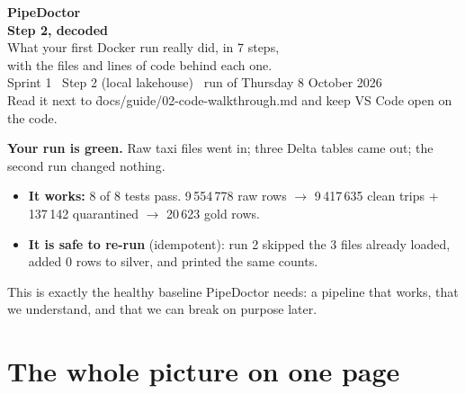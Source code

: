 \documentclass[11pt,a4paper]{article}
\let\oldsection\section
\renewcommand{\section}{\Needspace*{9\baselineskip}\oldsection}
\begin{document}
\sloppy

\begin{tcolorbox}[enhanced,colback=navy,colframe=navy,arc=4pt,boxrule=0pt,left=14pt,right=14pt,top=12pt,bottom=12pt]
{\color{white}
{\Huge\bfseries PipeDoctor\\[2pt]Step 2, decoded}\\[8pt]
{\large What your first Docker run really did, in 7 steps,\\ with the files and lines of code behind each one.}\\[10pt]
{\small Sprint 1 \textperiodcentered\ Step 2 (local lakehouse) \textperiodcentered\ run of Thursday 8 October 2026\\
Read it next to \f{docs/guide/02-code-walkthrough.md} and keep VS Code open on the code.}}
\end{tcolorbox}

\begin{good}
\textbf{Your run is green.} Raw taxi files went in; three Delta tables came out; the second run changed nothing.\par\smallskip
\begin{itemize}[leftmargin=14pt,itemsep=1pt,topsep=2pt]
\item \textbf{It works:} 8 of 8 tests pass. 9\,554\,778 raw rows $\rightarrow$ 9\,417\,635 clean trips + 137\,142 quarantined $\rightarrow$ 20\,623 gold rows.
\item \textbf{It is safe to re-run} (idempotent): run 2 skipped the 3 files already loaded, added 0 rows to silver, and printed the same counts.
\end{itemize}
This is exactly the healthy baseline PipeDoctor needs: a pipeline that works, that we understand, and that we can break on purpose later.
\end{good}

\section{The whole picture on one page}
\end{document}
